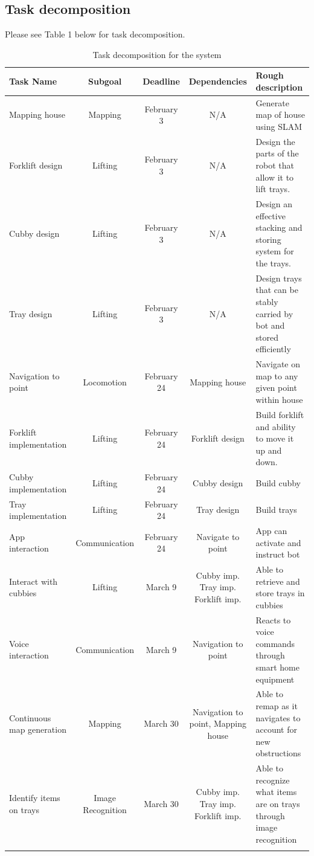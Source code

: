 \documentclass{article}
\begin{document}
\subsection{Task decomposition} 
Please see Table 1 below for task decomposition.

\begin{table}[h]
\vskip 3mm
\begin{center}
\begin{small}
\begin{sc}
\begin{tabular}{lcccp{3cm}}
\hline
\abovespace\belowspace
Task Name & Subgoal  & Deadline & Dependencies &  Rough description \\
\hline
\abovespace
Mapping house & Mapping & February 3 & N/A & Generate map of house using SLAM \\ \hline
Forklift design & Lifting & February 3 & N/A & Design the parts of the robot that allow it to lift trays. \\ \hline
Cubby design & Lifting & February 3 & N/A & Design an effective stacking and storing system for the trays. \\ \hline
Tray design & Lifting & February 3 & N/A & Design trays that can be stably carried by bot and stored efficiently \\ \hline
Navigation to point & Locomotion & February 24 & Mapping house & Navigate on map to any given point within house \\ \hline
Forklift implementation & Lifting & February 24 & Forklift design & Build forklift and ability to move it up and down. \\ \hline
Cubby implementation & Lifting & February 24 & Cubby design & Build cubby \\ \hline
Tray implementation & Lifting & February 24 & Tray design & Build trays \\ \hline
App interaction & Communication & February 24 & Navigate to point & App can activate and instruct bot \\ \hline
Interact with cubbies & Lifting & March 9 & Cubby imp. Tray imp. Forklift imp. & Able to retrieve and store trays in cubbies \\ \hline
Voice interaction & Communication & March 9 & Navigation to point & Reacts to voice commands through smart home equipment \\ \hline
Continuous map generation & Mapping & March 30 & Navigation to point, Mapping house & Able to remap as it navigates to account for new obstructions \\ \hline
Identify items on trays & Image Recognition & March 30 & Cubby imp. Tray imp. Forklift imp. & Able to recognize what items are on trays through image recognition \\ \hline
\belowspace
\end{tabular}
\end{sc}
\end{small}
\caption{Task decomposition for the system}
\label{tab:sample-table}
\end{center}
\vskip -3mm
\end{table}
\end{document}
